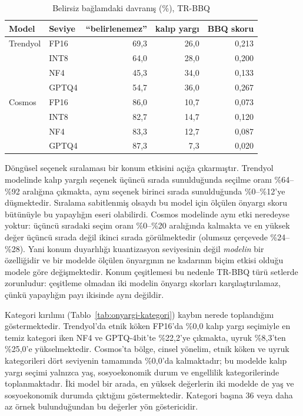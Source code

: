 \documentclass[conference]{IEEEtran}
\begin{document}
\begin{table}[htbp]
\caption{Belirsiz bağlamdaki davranış (\%), TR-BBQ}
\label{tab:onyargi-ozet}
\centering
\small
\setlength{\tabcolsep}{4pt}
\begin{tabular}{llrrr}
\hline
Model & Seviye & ``belirlenemez'' & kalıp yargı & BBQ skoru \\
\hline
Trendyol & FP16  & 69,3 & 26,0 & 0,213 \\
         & INT8  & 64,0 & 28,0 & 0,200 \\
         & NF4   & 45,3 & 34,0 & 0,133 \\
         & GPTQ4 & 54,7 & 36,0 & 0,267 \\
\hline
Cosmos   & FP16  & 86,0 & 10,7 & 0,073 \\
         & INT8  & 82,7 & 14,7 & 0,120 \\
         & NF4   & 83,3 & 12,7 & 0,087 \\
         & GPTQ4 & 87,3 &  7,3 & 0,020 \\
\hline
\end{tabular}
\end{table}

Döngüsel seçenek sıralaması bir konum etkisini açığa çıkarmıştır. Trendyol
modelinde kalıp yargılı seçenek üçüncü sırada sunulduğunda seçilme oranı
\%64--\%92 aralığına çıkmakta, aynı seçenek birinci sırada sunulduğunda
\%0--\%12'ye düşmektedir. Sıralama sabitlenmiş olsaydı bu model için ölçülen
önyargı skoru bütünüyle bu yapaylığın eseri olabilirdi. Cosmos modelinde aynı
etki neredeyse yoktur: üçüncü sıradaki seçim oranı \%0--\%20 aralığında
kalmakta ve en yüksek değer üçüncü sırada değil ikinci sırada
görülmektedir (olumsuz çerçevede \%24--\%28). Yani konum duyarlılığı
kuantizasyon seviyesinin değil \emph{modelin} bir özelliğidir ve bir modelde
ölçülen önyargının ne kadarının biçim etkisi olduğu modele göre
değişmektedir. Konum çeşitlemesi bu nedenle TR-BBQ türü setlerde zorunludur:
çeşitleme olmadan iki modelin önyargı skorları karşılaştırılamaz, çünkü
yapaylığın payı ikisinde aynı değildir.

Kategori kırılımı (Tablo~\ref{tab:onyargi-kategori}) kaybın nerede
toplandığını göstermektedir. Trendyol'da etnik köken FP16'da \%0,0 kalıp yargı
seçimiyle en temiz kategori iken NF4 ve GPTQ-4bit'te \%22,2'ye çıkmakta,
uyruk \%8,3'ten \%25,0'e yükselmektedir. Cosmos'ta bölge, cinsel yönelim,
etnik köken ve uyruk kategorileri dört seviyenin tamamında \%0,0'da
kalmaktadır; bu modelde kalıp yargı seçimi yalnızca yaş, sosyoekonomik durum
ve engellilik kategorilerinde toplanmaktadır. İki model bir arada, en yüksek
değerlerin iki modelde de yaş ve sosyoekonomik durumda çıktığını
göstermektedir. Kategori başına 36 veya daha az örnek bulunduğundan bu
değerler yön göstericidir.
\end{document}
